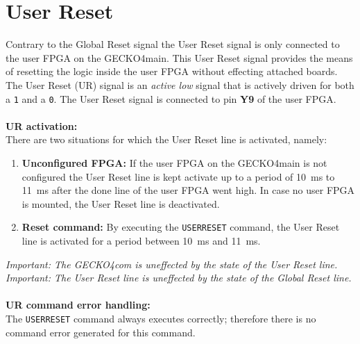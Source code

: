 \section{User Reset}
\label{chap:user_reset}
Contrary to the Global Reset signal the User Reset signal is only connected to
the user FPGA on the {\sc GECKO4main}. This User Reset signal provides the means
of resetting the logic inside the user FPGA without effecting attached
boards. The User Reset (UR) signal is an \emph{active low} signal that is actively
driven for both a \verb+1+ and a \verb+0+. The User Reset signal is connected to
pin \textbf{Y9} of the user FPGA.\\
 \\
\textbf{UR activation:}\\
There are two situations for which the User Reset line is activated, namely:
\begin{enumerate}
\item \textbf{Unconfigured FPGA:} If the user FPGA on the {\sc GECKO4main} is
not configured the User Reset line is kept activate up to a period of 10~ms to
11~ms after the done line of the user FPGA went high.
In case no user FPGA is mounted, the User Reset line is deactivated.
\item \textbf{Reset command:} By executing the \verb+USERRESET+ command, the
User Reset line is activated for a period between 10~ms and 11~ms.
\end{enumerate}
\textit{Important: The {\sc GECKO4com} is uneffected by the state of the User Reset
line.\important}\\
\textit{Important: The User Reset line is uneffected by the state of the Global
Reset line.\important}\\
 \\
\textbf{UR command error handling:}\\
The \verb+USERRESET+ command always executes correctly; therefore there is no command
error generated for this command.

